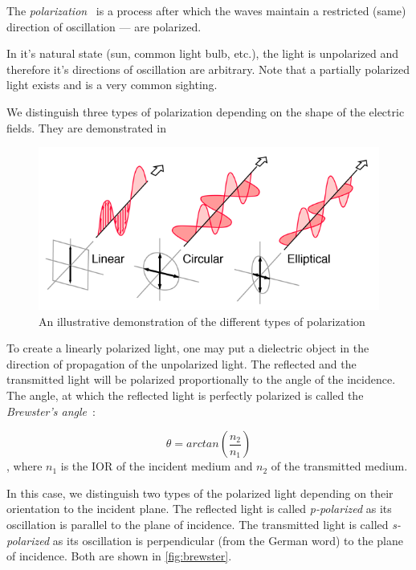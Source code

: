 The \emph{polarization}~\cite{cambridgeDict} is a process after which the waves maintain a restricted (same) direction of oscillation --- are polarized.

In it's natural state (sun, common light bulb, etc.), the light is unpolarized and therefore it's directions of oscillation are arbitrary. Note that a partially polarized light exists and is a very common sighting.

We distinguish three types of polarization depending on the shape of the electric fields. They are demonstrated in 

\begin{figure}[h]
	\centering
	\includegraphics[width=.8\linewidth]{img/polar_types.png}
	\caption[polar types]{An illustrative demonstration of the different types of polarization \footnotemark}
	\label{fig:polar_types}
\end{figure}

To create a linearly polarized light, one may put a dielectric object in the direction of propagation of the unpolarized light. The reflected and the transmitted light will be polarized proportionally to the angle of the incidence. The angle, at which the reflected light is perfectly polarized is called the \emph{Brewster's angle}~\cite{brewster1815laws}:

\begin{equation}
\theta=arctan(\frac{n_2}{n_1})
\end{equation}
, where $n_1$ is the IOR of the incident medium and $n_2$ of the transmitted medium.

In this case, we distinguish two types of the polarized light depending on their orientation to the incident plane. The reflected light is called \emph{p-polarized} as its oscillation is parallel to the plane of incidence. The transmitted light is called \emph{s-polarized} as its oscillation is perpendicular (from the German word) to the plane of incidence. Both are shown in \autoref{fig:brewster}.

